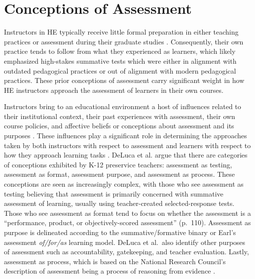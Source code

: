\documentclass[
]{book}
\begin{document}
\hypertarget{conceptions-of-assessment}{%
\section*{Conceptions of Assessment}\label{conceptions-of-assessment}}

Instructors in HE typically receive little formal preparation in either teaching practices or assessment during their graduate studies \citep{lipnevichWhatGradesMean2020, masseyAssessmentLiteracyCollege2020}. Consequently, their own practice tends to follow from what they experienced as learners, which likely emphasized high-stakes summative tests which were either in alignment with outdated pedagogical practices or out of alignment with modern pedagogical practices. These prior conceptions of assessment carry significant weight in how HE instructors approach the assessment of learners in their own courses.

Instructors bring to an educational environment a host of influences related to their institutional context, their past experiences with assessment, their own course policies, and affective beliefs or conceptions about assessment and its purposes \citep{biggsTheoryPracticeCognitive1993, brownQueenslandTeachersConceptions2011}. These influences play a significant role in determining the approaches taken by both instructors with respect to assessment and learners with respect to how they approach learning tasks \citep{brownQueenslandTeachersConceptions2011}. DeLuca et al. \citeyearpar{delucaEstablishingFoundationValid2013} argue that there are categories of conceptions exhibited by K-12 preservice teachers: assessment as testing, assessment as format, assessment purpose, and assessment as process. These conceptions are seen as increasingly complex, with those who see assessment as testing believing that assessment is primarily concerned with summative assessment of learning, usually using teacher-created selected-response tests. Those who see assessment as format tend to focus on whether the assessment is a ``performance, product, or objectively-scored assessment'' (p.~110). Assessment as purpose is delineated according to the summative/formative binary or Earl's \citeyearpar{earlAssessmentLearningUsing2013} assessment \emph{of/for/as} learning model. DeLuca et al.~also identify other purposes of assessment such as accountability, gatekeeping, and teacher evaluation. Lastly, assessment as process, which is based on the National Research Council's description of assessment being a process of reasoning from evidence \citeyearpar{pellegrinoKnowingWhatStudents2001}.
\end{document}

